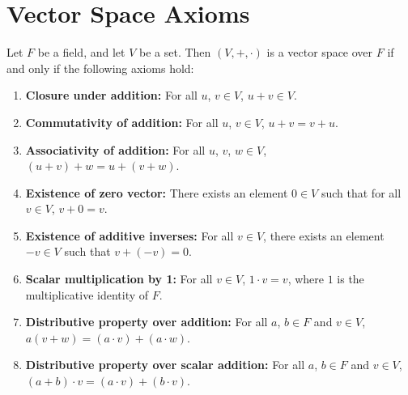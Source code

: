 \documentclass{article}
\begin{document}
\section{Vector Space Axioms}

Let $F$ be a field, and let $V$ be a set. Then $(V, +, \cdot)$ is a vector space over $F$ if and only if the following axioms hold:

\begin{enumerate}
    \item \textbf{Closure under addition:} For all $u$, $v \in V$, $u + v \in V$.
    \item \textbf{Commutativity of addition:} For all $u$, $v \in V$, $u + v = v + u$.
    \item \textbf{Associativity of addition:} For all $u$, $v$, $w \in V$, $(u + v) + w = u + (v + w)$.
    \item \textbf{Existence of zero vector:} There exists an element $0 \in V$ such that for all $v \in V$, $v + 0 = v$.
    \item \textbf{Existence of additive inverses:} For all $v \in V$, there exists an element $-v \in V$ such that $v + (-v) = 0$.
    \item \textbf{Scalar multiplication by 1:} For all $v \in V$, $1 \cdot v = v$, where $1$ is the multiplicative identity of $F$.
    \item \textbf{Distributive property over addition:} For all $a$, $b \in F$ and $v \in V$, $a(v + w) = (a \cdot v) + (a \cdot w)$.
    \item \textbf{Distributive property over scalar addition:} For all $a$, $b \in F$ and $v \in V$, $(a + b) \cdot v = (a \cdot v) + (b \cdot v)$.
\end{enumerate}
\end{document}

